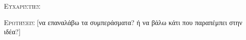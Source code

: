 \documentclass{beamer}
\begin{document}
  \begin{frame}{ \scshape Ευχαριστίες} 
  \end{frame}
  \begin{frame}[standout]{ \scshape Ερωτήσεις} 
    [να επαναλάβω τα συμπεράσματα? ή να βάλω κάτι που παραπέμπει στην ιδέα?]
  \end{frame}
  \begin{frame}[allowframebreaks]{}
\nocite{*}
\printbibliography[title=Bιβλιογραφία(να μπει??)  ]
  \end{frame} 
\end{document}
